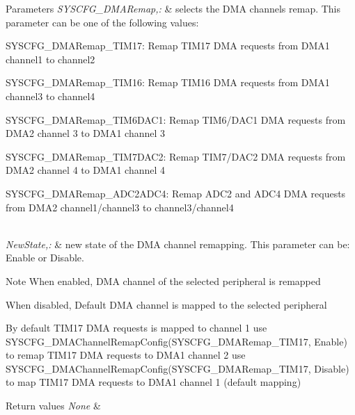 \begin{DoxyParams}{Parameters}
{\em S\-Y\-S\-C\-F\-G\-\_\-\-D\-M\-A\-Remap,\-:} & selects the D\-M\-A channels remap. This parameter can be one of the following values\-: \begin{DoxyItemize}
\item S\-Y\-S\-C\-F\-G\-\_\-\-D\-M\-A\-Remap\-\_\-\-T\-I\-M17\-: Remap T\-I\-M17 D\-M\-A requests from D\-M\-A1 channel1 to channel2 \item S\-Y\-S\-C\-F\-G\-\_\-\-D\-M\-A\-Remap\-\_\-\-T\-I\-M16\-: Remap T\-I\-M16 D\-M\-A requests from D\-M\-A1 channel3 to channel4 \item S\-Y\-S\-C\-F\-G\-\_\-\-D\-M\-A\-Remap\-\_\-\-T\-I\-M6\-D\-A\-C1\-: Remap T\-I\-M6/\-D\-A\-C1 D\-M\-A requests from D\-M\-A2 channel 3 to D\-M\-A1 channel 3 \item S\-Y\-S\-C\-F\-G\-\_\-\-D\-M\-A\-Remap\-\_\-\-T\-I\-M7\-D\-A\-C2\-: Remap T\-I\-M7/\-D\-A\-C2 D\-M\-A requests from D\-M\-A2 channel 4 to D\-M\-A1 channel 4 \item S\-Y\-S\-C\-F\-G\-\_\-\-D\-M\-A\-Remap\-\_\-\-A\-D\-C2\-A\-D\-C4\-: Remap A\-D\-C2 and A\-D\-C4 D\-M\-A requests from D\-M\-A2 channel1/channel3 to channel3/channel4 \end{DoxyItemize}
\\
\hline
{\em New\-State,\-:} & new state of the D\-M\-A channel remapping. This parameter can be\-: Enable or Disable. \\
\hline
\end{DoxyParams}
\begin{DoxyNote}{Note}
When enabled, D\-M\-A channel of the selected peripheral is remapped 

When disabled, Default D\-M\-A channel is mapped to the selected peripheral 

By default T\-I\-M17 D\-M\-A requests is mapped to channel 1 use S\-Y\-S\-C\-F\-G\-\_\-\-D\-M\-A\-Channel\-Remap\-Config(\-S\-Y\-S\-C\-F\-G\-\_\-\-D\-M\-A\-Remap\-\_\-\-T\-I\-M17, Enable) to remap T\-I\-M17 D\-M\-A requests to D\-M\-A1 channel 2 use S\-Y\-S\-C\-F\-G\-\_\-\-D\-M\-A\-Channel\-Remap\-Config(\-S\-Y\-S\-C\-F\-G\-\_\-\-D\-M\-A\-Remap\-\_\-\-T\-I\-M17, Disable) to map T\-I\-M17 D\-M\-A requests to D\-M\-A1 channel 1 (default mapping) 
\end{DoxyNote}

\begin{DoxyRetVals}{Return values}
{\em None} & \\
\hline
\end{DoxyRetVals}


